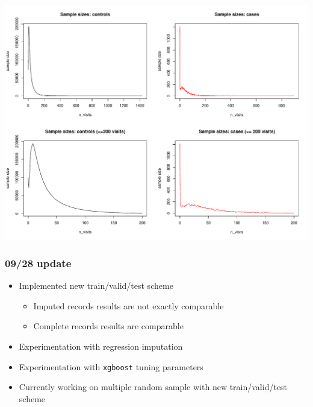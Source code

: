 \documentclass[12pt]{article}
\begin{document}
\begin{center}
\includegraphics[width=\textwidth]{nvisits_samplesize.pdf}
\end{center}

\pagebreak
\subsubsection*{09/28 update}

\begin{itemize}
	\item Implemented new train/valid/test scheme
	\begin{itemize}
		\item Imputed records results are not exactly comparable
		\item Complete records results are comparable
	\end{itemize}
	\item Experimentation with regression imputation
	\item Experimentation with \texttt{xgboost} tuning parameters
	\item Currently working on multiple random sample with new train/valid/test scheme
\end{itemize}
\end{document}
